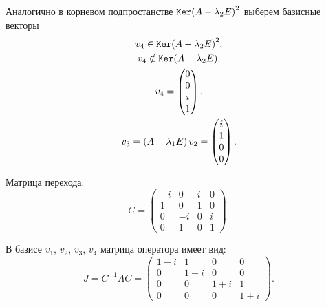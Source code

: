 \documentclass[12pt]{article}
\begin{document}
    Аналогично в корневом подпростанстве $\mathtt{Ker}{\left ( A - \lambda_2 E \right )^2}$ выберем базисные векторы
    \begin{gather*}
        v_4 \in \mathtt{Ker}{\left ( A - \lambda_2 E \right)^2}, \\
        v_4 \notin \mathtt{Ker}{\left ( A - \lambda_2 E \right)}, \\
        v_4 = \begin{pmatrix}
                  0 \\ 0 \\ i \\ 1
        \end{pmatrix}, \\
        v_3
        = \left ( A - \lambda_1 E \right) v_2
        = \begin{pmatrix}
              i \\ 1 \\ 0 \\ 0
        \end{pmatrix} .
    \end{gather*}

    Матрица перехода:
    \[
        C
        = \begin{pmatrix}
              -i & 0  & i & 0 \\
              1  & 0  & 1 & 0 \\
              0  & -i & 0 & i \\
              0  & 1  & 0 & 1
        \end{pmatrix}.
    \]

    В базисе $v_1$, $v_2$, $v_3$, $v_4$ матрица оператора имеет вид:
    \[
        J
        = C^{-1} A C
        = \begin{pmatrix}
              1 - i & 1     & 0     & 0     \\
              0     & 1 - i & 0     & 0     \\
              0     & 0     & 1 + i & 1     \\
              0     & 0     & 0     & 1 + i
        \end{pmatrix}.
    \]
\end{document}

